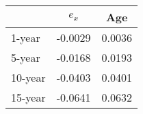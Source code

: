 \begin{tabular}{l|cc}
  \hline
 & $e_x$ & Age \\ 
  \hline
1-year & -0.0029 & 0.0036 \\ 
  5-year & -0.0168 & 0.0193 \\ 
  10-year & -0.0403 & 0.0401 \\ 
  15-year & -0.0641 & 0.0632 \\ 
   \hline
\end{tabular}
